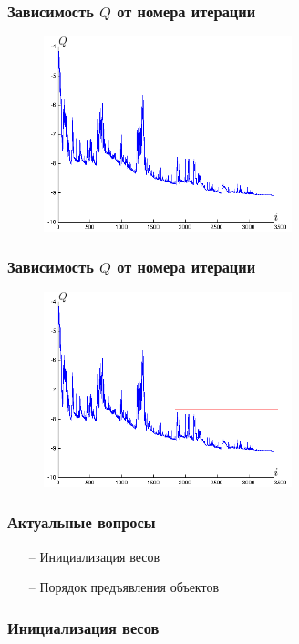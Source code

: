 \documentclass[12pt]{beamer}
\begin{document}
\begin{frame}\frametitle{Зависимость $Q$ от номера итерации}
\begin{figure}[htbp]
  \includegraphics[height=160pt, keepaspectratio = true]{images/stochastic_gradient}   
\end{figure}
\end{frame}

\begin{frame}\frametitle{Зависимость $Q$ от номера итерации}
\begin{figure}[htbp]
  \includegraphics[height=160pt, keepaspectratio = true]{images/stochastic_gradient1}   
\end{figure}
\end{frame}

\begin{frame}\frametitle{Актуальные вопросы}
\begin{itemize}
\item[--] Инициализация весов
\item[--] Порядок предъявления объектов
\end{itemize}
\end{frame}

\begin{frame}\frametitle{Инициализация весов}

\end{frame}
\end{document}
